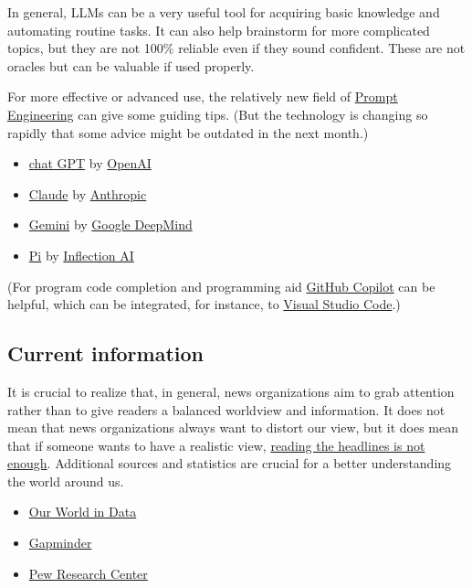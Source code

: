 \documentclass{article}
\begin{document}
In general, LLMs can be a very useful tool for acquiring basic knowledge and automating routine tasks. It can also help brainstorm for more complicated topics, but they are not 100\% reliable even if they sound confident. These are not oracles but can be valuable if used properly.

For more effective or advanced use, the relatively new field of \href{https://www.promptingguide.ai/}{Prompt Engineering} can give some guiding tips. (But the technology is changing so rapidly that some advice might be outdated in the next month.)

\begin{itemize}
    \item \href{https://chat.openai.com/}{chat GPT} by \href{https://en.wikipedia.org/wiki/OpenAI}{OpenAI}
    \item \href{https://claude.ai/}{Claude} by \href{https://en.wikipedia.org/wiki/Anthropic}{Anthropic}
    \item \href{https://gemini.google.com}{Gemini} by \href{https://en.wikipedia.org/wiki/Google_DeepMind}{Google DeepMind}
    \item \href{https://pi.ai/}{Pi} by \href{https://en.wikipedia.org/wiki/Inflection_AI}{Inflection AI}
\end{itemize}

(For program code completion and programming aid \href{https://github.com/features/copilot}{GitHub Copilot} can be helpful, which can be integrated, for instance, to \href{https://en.wikipedia.org/wiki/Visual_Studio_Code}{Visual Studio Code}.)


\subsection{Current information}

It is crucial to realize that, in general, news organizations aim to grab attention rather than to give readers a balanced worldview and information.
It does not mean that news organizations always want to distort our view, but it does mean that if someone wants to have a realistic view, \href{https://www.weforum.org/agenda/2019/06/does-the-news-reflect-what-we-die-from/}{reading the headlines is not enough}. Additional sources and statistics are crucial for a better understanding the world around us.

\begin{itemize}
    \item \href{https://ourworldindata.org/}{Our World in Data}
    \item \href{https://www.gapminder.org/}{Gapminder}
    \item \href{https://www.pewresearch.org/}{Pew Research Center}
\end{itemize}
\end{document}
